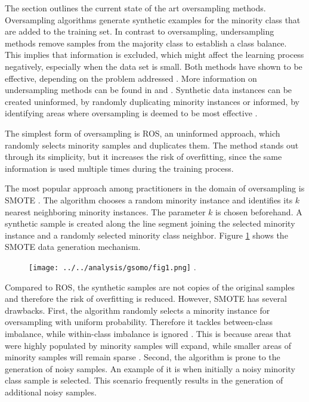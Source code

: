 \documentclass[parskip=full]{scrartcl}
\begin{document}
The section outlines the current state of the art oversampling methods. Oversampling algorithms generate synthetic examples for the minority class that are added to the training set. In contrast to oversampling, undersampling methods remove samples from the majority class to establish a class balance. This implies that information is excluded, which might affect the learning process negatively, especially when the data set is small. Both methods have shown to be effective, depending on the problem addressed \cite{Chawla2002}. More information on undersampling methods can be found in \cite{Ganganwar2012} and \cite{Yen2006}. Synthetic data instances can be created uninformed, by randomly duplicating minority instances or informed, by identifying areas where oversampling is deemed to be most effective \cite{Douzas2018a}.

The simplest form of oversampling is ROS, an uninformed approach, which randomly selects minority samples and duplicates them. The method stands out through its simplicity, but it increases the risk of overfitting, since the same information is used multiple times during the training process.

The most popular approach among practitioners in the domain of oversampling is SMOTE \cite{Chawla2002}. The algorithm chooses a random minority instance and identifies its $ k $ nearest neighboring minority instances. The parameter $ k $ is chosen beforehand. A synthetic sample is created along the line segment joining the selected minority instance and a randomly selected minority class neighbor. Figure \ref{fig:Schubach} shows the SMOTE data generation mechanism.

\begin{figure}[H]
	\centering
	\texttt{[image: ../../analysis/gsomo/fig1.png]}
	.
	\label{fig:Schubach}
\end{figure}

Compared to ROS, the synthetic samples are not copies of the original samples and therefore the risk of overfitting is reduced. However, SMOTE has several drawbacks. First, the algorithm randomly selects a minority instance for oversampling with uniform probability. Therefore it tackles between-class imbalance, while within-class imbalance is ignored \cite{Nekooeimehr2016}. This is because areas that were highly populated by minority samples will expand, while smaller areas of minority samples will remain sparse \cite{Prati2004}. Second, the algorithm is prone to the generation of noisy samples. An example of it is when initially a noisy minority class sample is selected. This scenario frequently results in the generation of additional noisy samples.
\end{document}
